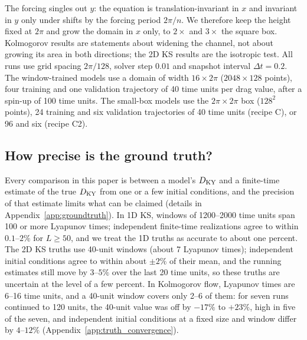 The forcing singles out $y$: the equation is translation-invariant in
$x$ and invariant in $y$ only under shifts by the forcing period $2\pi/n$.
We therefore keep the height fixed at $2\pi$ and grow the domain in $x$
only, to $2\times$ and $3\times$ the square box. Kolmogorov results are
statements about widening the channel, not about growing its area in
both directions; the 2D KS results are the isotropic test. All runs use
grid spacing $2\pi/128$, solver step $0.01$ and snapshot interval
$\Delta t=0.2$. The window-trained models use a domain of width
$16\times2\pi$ ($2048\times128$ points), four training and one validation
trajectory of 40 time units per drag value, after a spin-up of 100 time
units. The small-box models use the $2\pi\times2\pi$ box ($128^2$ points),
24 training and six validation trajectories of 40 time units (recipe C),
or 96 and six (recipe C2).

\subsection{How precise is the ground truth?}
\label{sec:truth_uncertainty}

Every comparison in this paper is between a model's $D_{\mathrm{KY}}$ and a
finite-time estimate of the true $D_{\mathrm{KY}}$ from one or a few initial
conditions, and the precision of that estimate limits what can be
claimed (details in Appendix~\ref{app:groundtruth}). In 1D KS, windows of
1200--2000 time units span 100 or more Lyapunov times; independent
finite-time realizations agree to within $0.1$--$2\%$ for $L\ge50$, and we
treat the 1D truths as accurate to about one percent. The 2D KS truths
use 40-unit windows (about 7 Lyapunov times); independent initial
conditions agree to within about $\pm2\%$ of their mean, and the running estimates still move by
$3$--$5\%$ over the last 20 time units, so these truths are uncertain at
the level of a few percent. In Kolmogorov flow, Lyapunov times are 6--16 time
units, and a 40-unit window covers only 2--6 of them: for seven runs
continued to 120 units, the 40-unit value was off by $-17\%$ to $+23\%$,
high in five of the seven, and independent initial conditions at a fixed
size and window differ by $4$--$12\%$
(Appendix~\ref{app:truth_convergence}).

